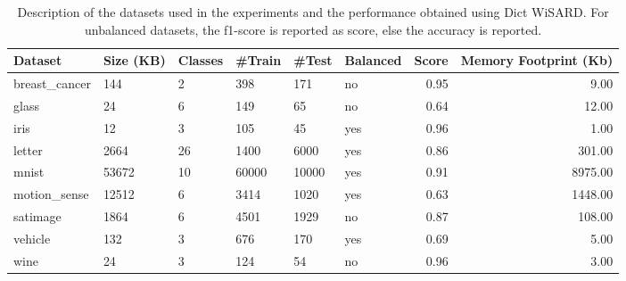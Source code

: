 \begin{table}
\centering
\caption{Description of the datasets used in the experiments and the performance obtained using Dict WiSARD. For unbalanced datasets, the f1-score is reported as score, else the accuracy is reported.}
\label{tab:datasets}
\begin{tabular}{llllllrr}
\toprule
      Dataset & Size (KB) & Classes & \#Train & \#Test & Balanced &  Score &  Memory Footprint (Kb) \\
\midrule
breast\_cancer &       144 &       2 &    398 &   171 &       no &   0.95 &                   9.00 \\
        glass &        24 &       6 &    149 &    65 &       no &   0.64 &                  12.00 \\
         iris &        12 &       3 &    105 &    45 &      yes &   0.96 &                   1.00 \\
       letter &      2664 &      26 &   1400 &  6000 &      yes &   0.86 &                 301.00 \\
        mnist &     53672 &      10 &  60000 & 10000 &      yes &   0.91 &                8975.00 \\
 motion\_sense &     12512 &       6 &   3414 &  1020 &      yes &   0.63 &                1448.00 \\
     satimage &      1864 &       6 &   4501 &  1929 &       no &   0.87 &                 108.00 \\
      vehicle &       132 &       3 &    676 &   170 &      yes &   0.69 &                   5.00 \\
         wine &        24 &       3 &    124 &    54 &       no &   0.96 &                   3.00 \\
\bottomrule
\end{tabular}
\end{table}
